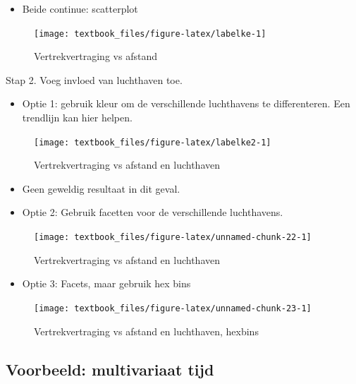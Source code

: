 \documentclass[]{tufte-book}
\providecommand{\tightlist}{%
  \setlength{\itemsep}{0pt}\setlength{\parskip}{0pt}}
\begin{document}
\begin{itemize}
\tightlist
\item
  Beide continue: scatterplot
\end{itemize}

\begin{figure}
\texttt{[image: textbook\_files/figure-latex/labelke-1]} \caption[Vertrekvertraging vs afstand]{Vertrekvertraging vs afstand}\label{fig:labelke}
\end{figure}

Stap 2. Voeg invloed van luchthaven toe.

\begin{itemize}
\tightlist
\item
  Optie 1: gebruik kleur om de verschillende luchthavens te differenteren. Een trendlijn kan hier helpen.
\end{itemize}

\begin{figure}
\texttt{[image: textbook\_files/figure-latex/labelke2-1]} \caption[Vertrekvertraging vs afstand en luchthaven]{Vertrekvertraging vs afstand en luchthaven}\label{fig:labelke2}
\end{figure}

\begin{itemize}
\item
  Geen geweldig resultaat in dit geval.
\item
  Optie 2: Gebruik facetten voor de verschillende luchthavens.
\end{itemize}

\begin{figure}
\texttt{[image: textbook\_files/figure-latex/unnamed-chunk-22-1]} \caption[Vertrekvertraging vs afstand en luchthaven]{Vertrekvertraging vs afstand en luchthaven}\label{fig:unnamed-chunk-22}
\end{figure}

\begin{itemize}
\tightlist
\item
  Optie 3: Facets, maar gebruik hex bins
\end{itemize}

\begin{figure}
\texttt{[image: textbook\_files/figure-latex/unnamed-chunk-23-1]} \caption[Vertrekvertraging vs afstand en luchthaven, hexbins]{Vertrekvertraging vs afstand en luchthaven, hexbins}\label{fig:unnamed-chunk-23}
\end{figure}

\hypertarget{voorbeeld-multivariaat-tijd}{%
\subsection{Voorbeeld: multivariaat tijd}\label{voorbeeld-multivariaat-tijd}}
\end{document}
